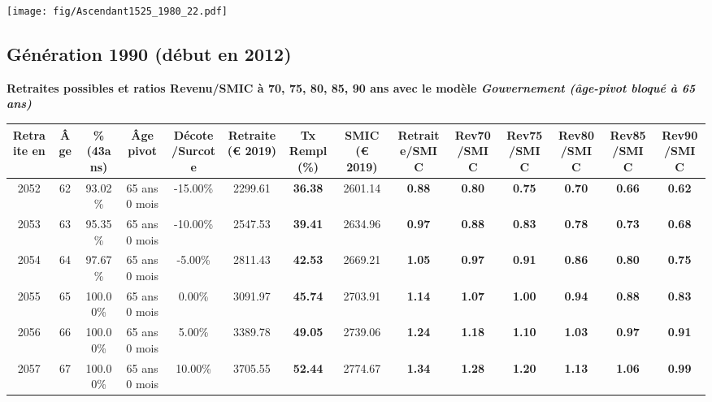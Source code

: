  \vspace{0.1cm} 

 \begin{center}\texttt{[image: fig/Ascendant1525\_1980\_22.pdf]}\end{center} \label{fig/Ascendant1525_1980_22.pdf} 

\newpage 
 
\subsection{Génération 1990 (début en 2012)} 

{\bf \noindent Retraites possibles et ratios Revenu/SMIC à 70, 75, 80, 85, 90 ans avec le modèle \emph{Gouvernement (âge-pivot bloqué à 65 ans)}}  
 
\begin{adjustbox}{max width=\textwidth} 
\begin{tabular}[htb]{|c|c||c|c|c||c|c||c||c|c|c|c|c|c|} 
\hline 
 Retraite en &  Âge &  \%(43ans) &  Âge pivot &  Décote/Surcote &  Retraite (\euro{} 2019) &  Tx Rempl(\%) &  SMIC (\euro{} 2019) &  Retraite/SMIC &  Rev70/SMIC &  Rev75/SMIC &  Rev80/SMIC &  Rev85/SMIC &  Rev90/SMIC \\ 
\hline \hline 
 2052 &  62 &  93.02\% &  65 ans 0 mois &  -15.00\% &  2299.61 &  {\bf 36.38} &  2601.14 &  {\bf {\color{red} 0.88}} &  {\bf {\color{red} 0.80}} &  {\bf {\color{red} 0.75}} &  {\bf {\color{red} 0.70}} &  {\bf {\color{red} 0.66}} &  {\bf {\color{red} 0.62}} \\ 
\hline 
 2053 &  63 &  95.35\% &  65 ans 0 mois &  -10.00\% &  2547.53 &  {\bf 39.41} &  2634.96 &  {\bf {\color{red} 0.97}} &  {\bf {\color{red} 0.88}} &  {\bf {\color{red} 0.83}} &  {\bf {\color{red} 0.78}} &  {\bf {\color{red} 0.73}} &  {\bf {\color{red} 0.68}} \\ 
\hline 
 2054 &  64 &  97.67\% &  65 ans 0 mois &  -5.00\% &  2811.43 &  {\bf 42.53} &  2669.21 &  {\bf 1.05} &  {\bf {\color{red} 0.97}} &  {\bf {\color{red} 0.91}} &  {\bf {\color{red} 0.86}} &  {\bf {\color{red} 0.80}} &  {\bf {\color{red} 0.75}} \\ 
\hline 
 2055 &  65 &  100.00\% &  65 ans 0 mois &  0.00\% &  3091.97 &  {\bf 45.74} &  2703.91 &  {\bf 1.14} &  {\bf 1.07} &  {\bf 1.00} &  {\bf {\color{red} 0.94}} &  {\bf {\color{red} 0.88}} &  {\bf {\color{red} 0.83}} \\ 
\hline 
 2056 &  66 &  100.00\% &  65 ans 0 mois &  5.00\% &  3389.78 &  {\bf 49.05} &  2739.06 &  {\bf 1.24} &  {\bf 1.18} &  {\bf 1.10} &  {\bf 1.03} &  {\bf {\color{red} 0.97}} &  {\bf {\color{red} 0.91}} \\ 
\hline 
 2057 &  67 &  100.00\% &  65 ans 0 mois &  10.00\% &  3705.55 &  {\bf 52.44} &  2774.67 &  {\bf 1.34} &  {\bf 1.28} &  {\bf 1.20} &  {\bf 1.13} &  {\bf 1.06} &  {\bf {\color{red} 0.99}} \\ 
\hline 
\hline 
\end{tabular} 
\end{adjustbox} 
 
